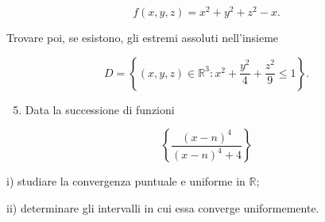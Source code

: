 \documentclass[10pt]{article}
\begin{document}
\[
f(x, y, z)=x^{2}+y^{2}+z^{2}-x .
\]

Trovare poi, se esistono, gli estremi assoluti nell'insieme

\[
D=\left\{(x, y, z) \in \mathbb{R}^{3}: x^{2}+\frac{y^{2}}{4}+\frac{z^{2}}{9} \leq 1\right\} .
\]

\begin{enumerate}
  \setcounter{enumi}{4}
  \item Data la successione di funzioni
\end{enumerate}

\[
\left\{\frac{(x-n)^{4}}{(x-n)^{4}+4}\right\}
\]

i) studiare la convergenza puntuale e uniforme in \(\mathbb{R}\);

ii) determinare gli intervalli in cui essa converge uniformemente.
\end{document}
